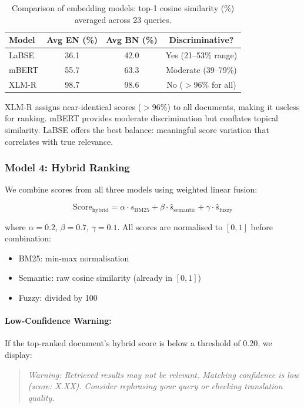 \documentclass[12pt,a4paper]{article}
\begin{document}
\begin{table}[H]
\centering
\caption{Comparison of embedding models: top-1 cosine similarity (\%) averaged across 23 queries.}
\label{tab:model_comparison}
\begin{tabular}{lccc}
\toprule
\textbf{Model} & \textbf{Avg EN (\%)} & \textbf{Avg BN (\%)} & \textbf{Discriminative?} \\
\midrule
LaBSE  & 36.1 & 42.0 & Yes (21--53\% range) \\
mBERT  & 55.7 & 63.3 & Moderate (39--79\%) \\
XLM-R  & 98.7 & 98.6 & No ($>$96\% for all) \\
\bottomrule
\end{tabular}
\end{table}

XLM-R assigns near-identical scores ($>$96\%) to all documents, making it useless for ranking. mBERT provides moderate discrimination but conflates topical similarity. LaBSE offers the best balance: meaningful score variation that correlates with true relevance.

\subsubsection{Model 4: Hybrid Ranking}

We combine scores from all three models using weighted linear fusion:

\begin{equation}
\text{Score}_{\text{hybrid}} = \alpha \cdot \hat{s}_{\text{BM25}} + \beta \cdot \hat{s}_{\text{semantic}} + \gamma \cdot \hat{s}_{\text{fuzzy}}
\end{equation}

where $\alpha = 0.2$, $\beta = 0.7$, $\gamma = 0.1$. All scores are normalised to $[0, 1]$ before combination:
\begin{itemize}
    \item BM25: min-max normalisation
    \item Semantic: raw cosine similarity (already in $[0,1]$)
    \item Fuzzy: divided by 100
\end{itemize}

\paragraph{Low-Confidence Warning:} If the top-ranked document's hybrid score is below a threshold of 0.20, we display:
\begin{quote}
\textit{Warning: Retrieved results may not be relevant. Matching confidence is low (score: X.XX). Consider rephrasing your query or checking translation quality.}
\end{quote}
\end{document}
